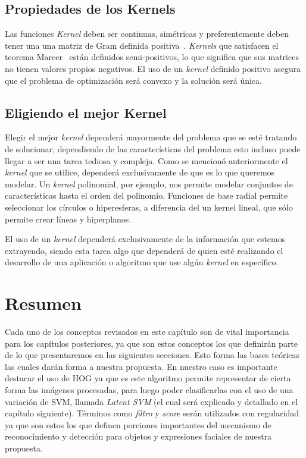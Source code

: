 \subsection{Propiedades de los Kernels}

Las funciones \textit{Kernel} deben ser continuas, simétricas y preferentemente deben tener una una matriz de Gram definida positiva~\cite{Gram}. \textit{Kernels} que satisfacen el teorema Marcer~\cite{minh2006mercer} están definidos semi-positivos, lo que significa que sus matrices no tienen valores propios negativos. El uso de un \textit{kernel} definido positivo asegura que el problema de optimización será convexo y la solución será única.

\subsection{Eligiendo el mejor Kernel}

Elegir el mejor \textit{kernel} dependerá mayormente del problema que se esté tratando de solucionar, dependiendo de las características del problema esto incluso puede llegar a ser una tarea tediosa y compleja. Como se mencionó anteriormente el \textit{kernel} que se utilice, dependerá exclusivamente de que es lo que queremos modelar. Un \textit{kernel} polinomial, por ejemplo, nos permite modelar conjuntos de características hasta el orden del polinomio. Funciones de base radial permite seleccionar los círculos o hiperesferas, a diferencia del un kernel lineal, que sólo permite crear líneas y hiperplanos.

El uso de un \textit{kernel} dependerá exclusivamente de la información que estemos extrayendo, siendo esta tarea algo que dependerá de quien esté realizando el desarrollo de una aplicación o algoritmo que use algún \textit{kernel} en específico.

\section{Resumen}\label{sec:resumen}

Cada uno de los conceptos revisados en este capítulo son de vital importancia para los capítulos posteriores, ya que son estos conceptos los que definirán parte de lo que presentaremos en las siguientes secciones. Esto forma las bases teóricas las cuales darán forma a nuestra propuesta. En nuestro caso es importante destacar el uso de HOG ya que es este algoritmo permite representar de cierta forma las imágenes procesadas, para luego poder clasificarlas con el uso de una variación de SVM, llamada \textit{Latent SVM} (el cual será explicado y detallado en el capítulo siguiente). Términos como \textit{filtro} y \textit{score} serán utilizados con regularidad ya que son estos los que definen porciones importantes del mecanismo de reconocimiento y detección para objetos y expresiones faciales de nuestra propuesta.


